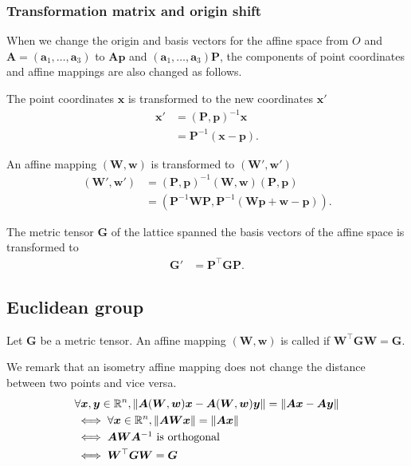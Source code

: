 \subsubsection{Transformation matrix and origin shift}

When we change the origin and basis vectors for the affine space from $O$ and $\bm{A} = (\bm{a}_{1}, \dots, \bm{a}_{3})$ to $\bm{Ap}$ and $(\bm{a}_{1}, \dots, \bm{a}_{3})\bm{P}$, the components of point coordinates and affine mappings are also changed as follows.

The point coordinates $\bm{x}$ is transformed to the new coordinates $\bm{x}'$
\begin{align}
  \bm{x}'
  &= (\bm{P}, \bm{p})^{-1} \bm{x} \nonumber \\
  &= \bm{P}^{-1} ( \bm{x} - \bm{p} ).
\end{align}

An affine mapping $(\bm{W}, \bm{w})$ is transformed to $(\bm{W}', \bm{w}')$
\begin{align}
  \label{eq:operation_transformation}
  (\bm{W}', \bm{w}')
  &= (\bm{P}, \bm{p})^{-1} (\bm{W}, \bm{w}) (\bm{P}, \bm{p}) \nonumber \\
  &= \left( \bm{P}^{-1} \bm{W} \bm{P}, \bm{P}^{-1}(\bm{Wp} + \bm{w} - \bm{p}) \right).
\end{align}

The metric tensor $\bm{G}$ of the lattice spanned the basis vectors of the affine space is transformed to
\begin{align}
  \bm{G}' &= \bm{P}^{\top} \bm{GP}.
\end{align}


\subsection{Euclidean group}

\begin{screen}
  \begin{defn}[isometry]
    Let $\bm{G}$ be a metric tensor.
    An affine mapping $(\bm{W}, \bm{w})$ is called  if $\bm{W}^{\top} \bm{G} \bm{W} = \bm{G}$.
  \end{defn}
\end{screen}

We remark that an isometry affine mapping does not change the distance between two points and vice versa.
\begin{align*}
  &\forall \bm{x}, \bm{y} \in \mathbb{R}^{n}, \left\lVert \bm{A} (\bm{W}, \bm{w}) \bm{x} - \bm{A} (\bm{W}, \bm{w}) \bm{y}\right\rVert = \left\lVert\bm{Ax} - \bm{Ay}\right\rVert \\
  &\iff \forall \bm{x} \in \mathbb{R}^{n}, \left\lVert \bm{AW} \bm{x} \right\rVert = \left\lVert\bm{Ax}\right\rVert \\
  &\iff \mbox{$\bm{A} \bm{W} \bm{A}^{-1}$ is orthogonal} \\
  &\iff \bm{W}^{\top} \bm{G} \bm{W} = \bm{G}
\end{align*}

